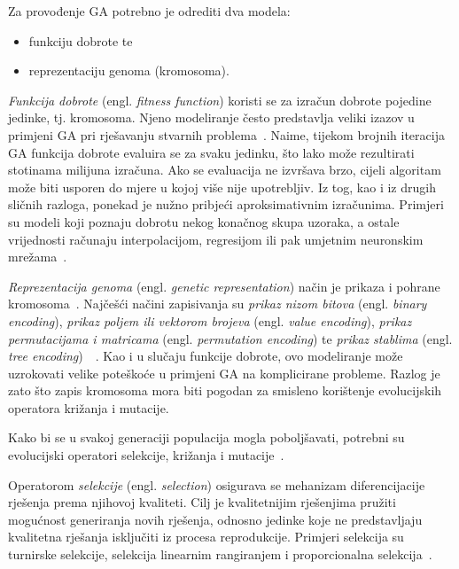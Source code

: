\documentclass[times, utf8, seminar, numeric]{fer}
\begin{document}
Za provođenje GA potrebno je odrediti dva modela:
\begin{itemize}
	\item funkciju dobrote te
	\vspace{-1mm}
	\item reprezentaciju genoma (kromosoma).
\end{itemize}
\medskip

\textit{Funkcija dobrote} (engl. \textit{fitness function}) koristi se za izračun dobrote pojedine jedinke, tj. kromosoma.
Njeno modeliranje često predstavlja veliki izazov u primjeni GA pri rješavanju stvarnih problema~\cite{WikiFitness}.
Naime, tijekom brojnih iteracija GA funkcija dobrote evaluira se za svaku jedinku, što lako može rezultirati stotinama milijuna izračuna.
Ako se evaluacija ne izvršava brzo, cijeli algoritam može biti usporen do mjere u kojoj više nije upotrebljiv.
Iz tog, kao i iz drugih sličnih razloga, ponekad je nužno pribjeći aproksimativnim izračunima.
Primjeri su modeli koji poznaju dobrotu nekog konačnog skupa uzoraka, a ostale vrijednosti računaju interpolacijom, regresijom ili pak umjetnim neuronskim mrežama~\cite{WikiFitnessApprox}.

\textit{Reprezentacija genoma} (engl. \textit{genetic representation}) način je prikaza i pohrane kromosoma~\cite{WikiGeneRepres}.
Najčešći načini zapisivanja su \textit{prikaz nizom bitova} (engl. \textit{binary encoding}), \textit{prikaz poljem ili vektorom brojeva} (engl. \textit{value encoding}), \textit{prikaz permutacijama i matricama} (engl. \textit{permutation encoding}) te \textit{prikaz stablima} (engl. \textit{tree encoding})~\cite{Kuthan2007GeneticAI}~\cite{Cupic}.
Kao i u slučaju funkcije dobrote, ovo modeliranje može uzrokovati velike poteškoće u primjeni GA na komplicirane probleme.
Razlog je zato što zapis kromosoma mora biti pogodan za smisleno korištenje evolucijskih operatora križanja i mutacije.

Kako bi se u svakoj generaciji populacija mogla poboljšavati, potrebni su evolucijski operatori selekcije, križanja i mutacije~\cite{Cupic}.

Operatorom \textit{selekcije} (engl. \textit{selection}) osigurava se mehanizam diferencijacije rješenja prema njihovoj kvaliteti.
Cilj je kvalitetnijim rješenjima pružiti mogućnost generiranja novih rješenja, odnosno jedinke koje ne predstavljaju kvalitetna rješanja isključiti iz procesa reprodukcije. 
Primjeri selekcija su turnirske selekcije, selekcija linearnim rangiranjem i proporcionalna selekcija~\cite{Cupic}.
\end{document}
